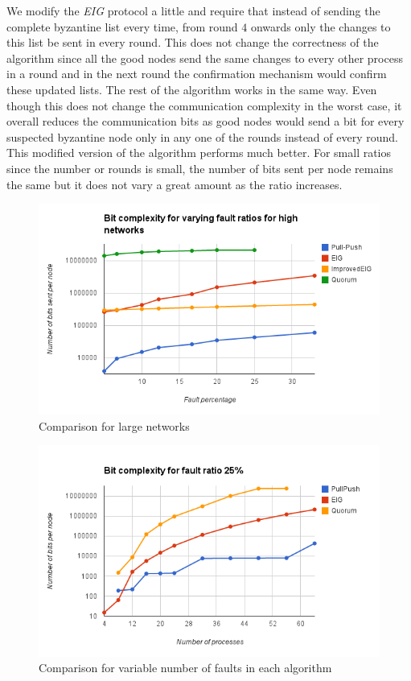 We modify the \textit{EIG} protocol a little and require that instead of sending the complete byzantine list every time, from round $4$ onwards only the changes to this list be sent in every round. This does not change the correctness of the algorithm since all the good nodes send the same changes to every other process in a round and in the next round the confirmation mechanism would confirm these updated lists. The rest of the algorithm works in the same way. Even though this does not change the communication complexity in the worst case, it overall reduces the communication bits as good nodes would send a bit for every suspected byzantine node only in any one of the rounds instead of every round. This modified version of the algorithm performs much better. For small ratios since the number or rounds is small, the number of bits sent per node remains the same but it does not vary a great amount as the ratio increases.
\begin{figure}[h]
 \centering
\includegraphics[scale=0.4]{LargeNetBit}
\caption{Comparison for large networks}
 \label{fig:comp}
\end{figure}

\begin{figure}[h]
 \centering
\includegraphics[scale=0.4]{Fault25}
\caption{ Comparison for variable number of faults in each algorithm}
 \label{fig:fault25}
\end{figure}

